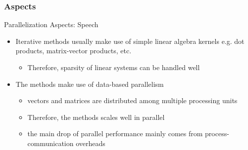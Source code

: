 \subsubsection{Aspects}

\ifSpeech
\begin{frame}[t]{Parallelization Aspects: Speech}
    \small
    \justifying
    \begin{itemize}
    	\item Iterative methods usually make use of simple linear algebra kernels e.g. dot products, matrix-vector products, etc.
    	
    	\begin{itemize}
    		\item Therefore, sparsity of linear systems can be handled well
    	\end{itemize}
    	
    	\item The methods make use of data-based parallelism
    	
    	\begin{itemize}
    		\item vectors and matrices are distributed among multiple processing units
    		
    		\item Therefore, the methods scales well in parallel
    		
    		\item the main drop of parallel performance mainly
comes from process-communication overheads	
    	\end{itemize}
    	
    \end{itemize}   
\end{frame}

